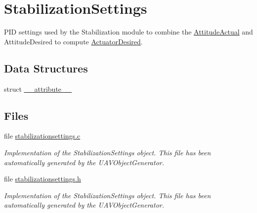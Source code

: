\hypertarget{group___stabilization_settings}{\section{\-Stabilization\-Settings}
\label{group___stabilization_settings}
}


\-P\-I\-D settings used by the \-Stabilization module to combine the \hyperlink{group___attitude_actual}{\-Attitude\-Actual} and \-Attitude\-Desired to compute \hyperlink{group___actuator_desired}{\-Actuator\-Desired}.  


\subsection*{\-Data \-Structures}
\begin{DoxyCompactItemize}
\item 
struct \hyperlink{struct____attribute____}{\-\_\-\-\_\-attribute\-\_\-\-\_\-}
\end{DoxyCompactItemize}
\subsection*{\-Files}
\begin{DoxyCompactItemize}
\item 
file \hyperlink{stabilizationsettings_8c}{stabilizationsettings.\-c}
\begin{DoxyCompactList}\small\item\em \-Implementation of the \-Stabilization\-Settings object. \-This file has been automatically generated by the \-U\-A\-V\-Object\-Generator. \end{DoxyCompactList}\item 
file \hyperlink{stabilizationsettings_8h}{stabilizationsettings.\-h}
\begin{DoxyCompactList}\small\item\em \-Implementation of the \-Stabilization\-Settings object. \-This file has been automatically generated by the \-U\-A\-V\-Object\-Generator. \end{DoxyCompactList}\end{DoxyCompactItemize}
